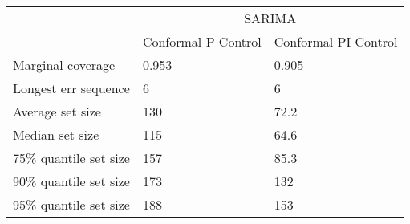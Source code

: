\begin{tabular}{lll}
\toprule
& \multicolumn{2}{c}{SARIMA} \\
& Conformal P Control & Conformal PI Control \\
\midrule
Marginal coverage & 0.953 & 0.905 \\
Longest err sequence & 6 & 6 \\
Average set size & 130 & 72.2 \\
Median set size & 115 & 64.6 \\
75\% quantile set size & 157 & 85.3 \\
90\% quantile set size & 173 & 132 \\
95\% quantile set size & 188 & 153 \\
\bottomrule
\end{tabular}
